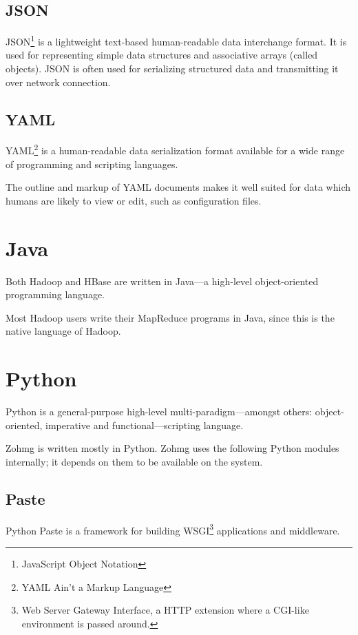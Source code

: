 \documentclass[a4paper,10pt]{book}
\begin{document}
\subsection{JSON}

JSON\footnote{JavaScript Object Notation} is a lightweight text-based
human-readable data interchange format. It is used for representing simple
data structures and associative arrays (called objects). JSON is often used
for serializing structured data and transmitting it over network
connection.


\subsection{YAML}

YAML\footnote{YAML Ain't a Markup Language} is a human-readable data
serialization format available for a wide range of programming and
scripting languages.

The outline and markup of YAML documents makes it well suited for data
which humans are likely to view or edit, such as configuration files.



\section{Java}

Both Hadoop and HBase are written in Java---a high-level object-oriented
programming language.

Most Hadoop users write their MapReduce programs in Java, since this is the
native language of Hadoop. \cite{java}



\section{Python}

Python is a general-purpose high-level multi-paradigm---amongst others:
object-oriented, imperative and functional---scripting language.
\cite{python}

Zohmg is written mostly in Python. Zohmg uses the following Python modules
internally; it depends on them to be available on the system.


\subsection{Paste}

Python Paste is a framework for building WSGI\footnote{Web Server Gateway
Interface, a HTTP extension where a CGI-like environment is passed around.}
applications and middleware. \cite{definitive_guide_to_pylons}
\end{document}
